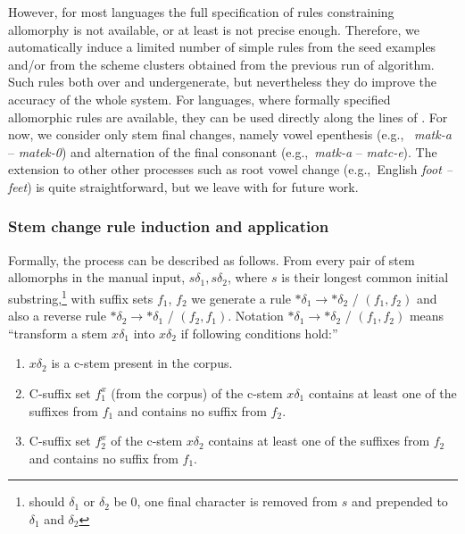 \documentclass{itatnew}
\newcommand{\e}[1]{\textit{#1}} %
\newcommand{\eg}{e.g.,~}
\newcommand{\todoja}[1]{[\textbf{TODOJ} #1]}
\begin{document}

However, for most languages the full specification of rules constraining allomorphy is not available, or at least is not precise enough. Therefore, we automatically induce a limited number of simple rules from the seed examples and/or from the scheme clusters obtained from the previous run of algorithm. Such rules both over and undergenerate, but nevertheless they do improve the accuracy of the whole system. For languages, where formally specified allomorphic rules are available, they can be used directly along the lines of
\cite{tepper10,tepper-xia-2008}.
%
For now, we consider only stem final changes, namely vowel epenthesis (\eg
\e{matk-a} -- \e{matek-0}) and alternation of the final consonant (\eg \e{matk-a} -- \e{matc-e}). The extension to other other processes such as root vowel change (\eg English \e{foot -- feet}) is quite straightforward, but we leave with for future work.



\subsubsection{Stem change rule induction and application}

\noindent
Formally, the process can be described as follows.
From every pair of stem allomorphs in the manual input, $s\delta_1, s\delta_2$, where $s$ is their longest common initial substring,\footnote{should $\delta_1$ or $\delta_2$ be 0, one final character is removed from $s$ and prepended to $\delta_1$ and $\delta_2$} with suffix
sets $f_1$, $f_2$ we generate a rule $*\delta_1 \rightarrow *\delta_2$ / $(f_1, f_2)$ and also a reverse rule $*\delta_2 \rightarrow *\delta_1$ / $(f_2, f_1)$. Notation $*\delta_1 \rightarrow *\delta_2$ / $(f_1, f_2)$ means ``transform a stem $x\delta_1$ into $x\delta_2$ if following conditions hold:''

\begin{enumerate}
\item $x\delta_2$ is a c-stem present in the corpus.
\item C-suffix set $f^x_1$ (from the corpus) of the c-stem $x\delta_1$ contains at least one of the suffixes from $f_1$ and contains no suffix from $f_2$.
\item C-suffix set $f^x_2$ of the c-stem $x\delta_2$ contains at least one of the suffixes from $f_2$ and contains no suffix from $f_1$.
\end{enumerate}
\end{document}

